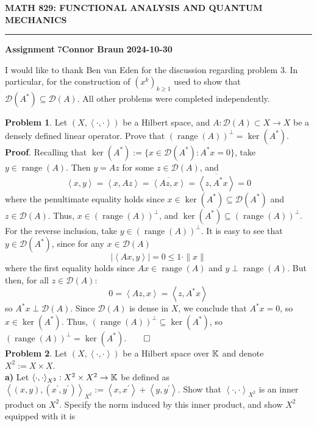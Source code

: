 \documentclass[10pt]{article}
\newcommand{\1}[1]{\mathbbm{1}_{#1}} \newcommand{\mc}[1]{\mathcal{#1}}
\newcommand{\ip}[2]{\left\langle#1,#2\right\rangle }
\DeclareMathOperator{\ran}{range}
\begin{document}
    \begin{center}
        {\bf\large{MATH 829: FUNCTIONAL ANALYSIS AND QUANTUM MECHANICS}}
        \smallskip
        \hrule
        \smallskip
        {\bf Assignment} 7\hfill {\bf Connor Braun} \hfill {\bf 2024-10-30}
    \end{center}
    \vspace{5pt}
    \begin{center}
        \begin{minipage}{\dimexpr\paperwidth-10cm}
            I would like to thank Ben van Eden for the discussion regarding problem 3. In particular, for the construction of $(x^k)_{k\geq 1}$ 
            used to show that $\mc{D}(A^\ast)\subseteq\mc{D}(A)$. All other problems were completed independently.
        \end{minipage}
    \end{center}
    {\bf Problem 1}. Let $(X,\ip{\cdot}{\cdot})$ be a Hilbert space, and
    $A:\mc{D}(A)\subset X\rightarrow X$ be a densely defined linear operator.
    Prove that $(\ran(A))^\perp=\ker(A^\ast)$.\\[5pt]
    {\bf Proof}. Recalling that $\ker(A^\ast):=\{x\in\mc{D}(A^\ast):A^\ast
    x=0\}$, take $y\in\ran(A)$. Then $y=Az$ for some $z\in\mc{D}(A)$, and
    \[\ip{x}{y}=\ip{x}{Az}=\overline{\ip{Az}{x}}=\overline{\ip{z}{A^\ast x}}=0\]
    where the penultimate equality holds since $x\in\ker(A^\ast)\subseteq
    \mc{D}(A^\ast)$ and $z\in\mc{D}(A)$. Thus, $x\in(\ran(A))^\perp$, and
    $\ker(A^\ast)\subseteq(\ran(A))^\perp$. For the reverse inclusion, take
    $y\in(\ran(A))^\perp$. It is easy to see that $y\in\mc{D}(A^\ast)$, since
    for any $x\in\mc{D}(A)$
    \[|\ip{Ax}{y}|=0\leq 1\cdot\|x\|\] where the first equality
    holds since $Ax\in\ran(A)$ and $y\perp\ran(A)$. But then, for all
    $z\in\mc{D}(A)$:
    \[0=\ip{Az}{x}=\ip{z}{A^\ast x}\] so $A^\ast x\perp\mc{D}(A)$. Since
    $\mc{D}(A)$ is dense in $X$, we conclude that $A^\ast x=0$, so
    $x\in\ker(A^\ast)$. Thus, $(\ran(A))^\perp\subseteq\ker(A^\ast)$, so
    $(\ran(A))^\perp=\ker(A^\ast)$.\hfill{$\qed$}\\[5pt]
    {\bf Problem 2}. Let $(X,\ip{\cdot}{\cdot})$ be a Hilbert space over
    $\mathbb{K}$ and denote $X^2:=X\times X$.\\[5pt]
    {\bf a)} Let $\ip{\cdot}{\cdot}_{X^2}:X^2\times X^2\rightarrow\mbb{K}$ be
    defined as
    $\ip{(x,y)}{(x^\prime,y^\prime)}_{X^2}:=\ip{x}{x^\prime}+\ip{y}{y^\prime}$.
    Show that $\ip{\cdot}{\cdot}_{X^2}$ is an inner product on $X^2$. Specify
    the norm induced by this inner product, and show $X^2$ equipped with it is
\end{document}
